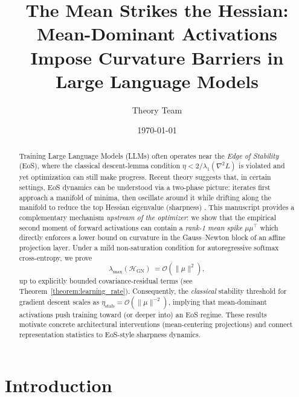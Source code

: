 \documentclass[11pt]{article}
\title{The Mean Strikes the Hessian: Mean-Dominant Activations Impose Curvature Barriers in Large Language Models}
\author{Theory Team}
\date{\today}
\begin{document}
\maketitle

\begin{abstract}
Training Large Language Models (LLMs) often operates near the \emph{Edge of Stability} (EoS), where the classical descent-lemma condition $\eta<2/\lambda_1(\nabla^2\!L)$ is violated and yet optimization can still make progress.
Recent theory suggests that, in certain settings, EoS dynamics can be understood via a two-phase picture: iterates first approach a manifold of minima, then oscillate around it while drifting along the manifold to reduce the top Hessian eigenvalue (sharpness) \citep{arora2022understanding}.
This manuscript provides a complementary mechanism \emph{upstream of the optimizer}: we show that the empirical second moment of forward activations can contain a \emph{rank-1 mean spike} $\mu\mu^\top$ which directly enforces a lower bound on curvature in the Gauss--Newton block of an affine projection layer.
Under a mild non-saturation condition for autoregressive softmax cross-entropy, we prove
\[
\lambda_{\max}(\mathcal{H}_{\mathrm{GN}})\ =\mathcal{O}(\|\mu\|^2),
\]
up to explicitly bounded covariance-residual terms (see Theorem~\ref{theorem:learning_rate}).
Consequently, the \emph{classical} stability threshold for gradient descent scales as $\eta_{\mathrm{stab}}=\mathcal{O}(\|\mu\|^{-2})$, implying that mean-dominant activations push training toward (or deeper into) an EoS regime.
These results motivate concrete architectural interventions (mean-centering projections) and connect representation statistics to EoS-style sharpness dynamics.
\end{abstract}

\section{Introduction}
\end{document}
